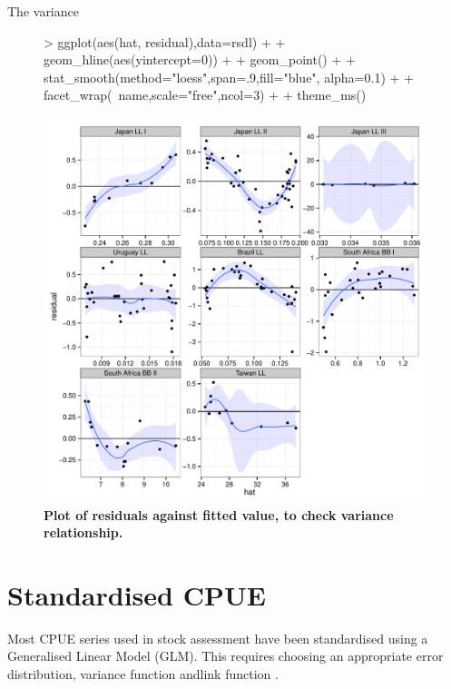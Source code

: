 \documentclass[shortnames,nojss,article]{jss}
\begin{document}
The variance 
\begin{figure}\begin{center}
\begin{Schunk}
\begin{Sinput}
> ggplot(aes(hat, residual),data=rsdl)   +
+   geom_hline(aes(yintercept=0))         +
+   geom_point()                          +
+   stat_smooth(method="loess",span=.9,fill="blue", alpha=0.1)   +
+   facet_wrap(~name,scale="free",ncol=3) +
+              theme_ms()
\end{Sinput}
\end{Schunk}
\includegraphics{diags-022}
\caption{\bf{Plot of residuals against fitted value, to check variance relationship.}}
\label{residual:5}
\end{center}\end{figure}

\clearpage
\section{Standardised CPUE}

Most CPUE series used in stock assessment have been standardised using a Generalised Linear Model (GLM). This
requires choosing an appropriate error distribution, variance function andlink function \cite{mccullagh1989generalized}.
\end{document}
